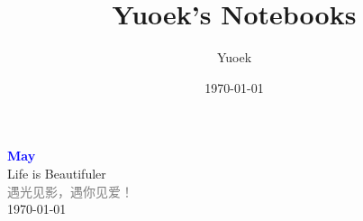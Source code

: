 \documentclass[UTF8, a4paper, 12pt]{ctexart}
\title{\Large Yuoek's Notebooks}
\author{Yuoek}
\date{\today}
\begin{document}
\thispagestyle{empty}
\maketitle
\clearpage

\thispagestyle{empty}
\vspace*{\fill}
\begin{center}
    \textcolor{blue}{\Huge\textbf{May}} \\[1em]
    \textcolor{blue!60!black}{\Large Life is Beautifuler} \\[2em]
    \textcolor{gray}{\large 遇光见影，遇你见爱！} \\[1em]
    \today
\end{center}

\vspace*{\fill}
\clearpage
\tableofcontents

\clearpage
\thispagestyle{empty}


\clearpage
\thispagestyle{empty}




\clearpage


\clearpage
\thispagestyle{empty}

\clearpage
\thispagestyle{empty}
\end{document}
